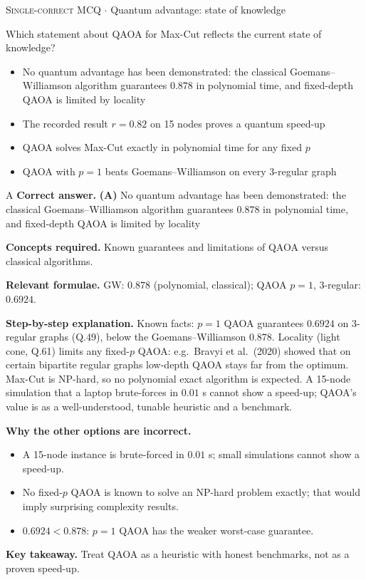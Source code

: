\documentclass[11pt,a4paper]{article}
\newcommand{\optlabel}[1]{\textbf{(#1)}}
\newcommand{\correctlabel}[1]{\textcolor{okgreen}{\textbf{(#1)}\,\ding{51}}}
\newenvironment{qitem}[1]{\begin{list}{}{\setlength{\leftmargin}{3.3em}\setlength{\labelwidth}{3.1em}%
  \setlength{\labelsep}{0.2em}\setlength{\topsep}{3pt}\setlength{\parsep}{3pt}}\item[\textbf{Q.#1}\hfill]}{\end{list}}
\newcommand{\qsep}{\par\vspace{2pt}{\color{black!15}\hrule}\vspace{4pt}}
\newcommand{\qmeta}[2]{{\footnotesize\color{black!60}\textsc{#1} \;$\cdot$\; #2}\par}
\begin{document}
\begin{qitem}{77}
\qmeta{Single-correct MCQ}{Quantum advantage: state of knowledge}
Which statement about QAOA for Max-Cut reflects the current state of knowledge?
\begin{itemize}[leftmargin=2.6em, labelsep=0.4em, itemsep=2pt, topsep=3pt]
\item[\correctlabel{A}] No quantum advantage has been demonstrated: the classical Goemans--Williamson algorithm guarantees $0.878$ in polynomial time, and fixed-depth QAOA is limited by locality
\item[\optlabel{B}] The recorded result $r = 0.82$ on 15 nodes proves a quantum speed-up
\item[\optlabel{C}] QAOA solves Max-Cut exactly in polynomial time for any fixed $p$
\item[\optlabel{D}] QAOA with $p = 1$ beats Goemans--Williamson on every 3-regular graph
\end{itemize}
\end{qitem}
\begin{solbox}{A}
\textbf{\color{brand}Correct answer.} \textcolor{okgreen}{\textbf{(A)}} No quantum advantage has been demonstrated: the classical Goemans--Williamson algorithm guarantees $0.878$ in polynomial time, and fixed-depth QAOA is limited by locality

\textbf{\color{brand}Concepts required.} Known guarantees and limitations of QAOA versus classical algorithms.

\textbf{\color{brand}Relevant formulae.} GW: $0.878$ (polynomial, classical); QAOA $p = 1$, 3-regular: $0.6924$.

\textbf{\color{brand}Step-by-step explanation.} Known facts: $p = 1$ QAOA guarantees $0.6924$ on 3-regular graphs (Q.49), below the Goemans--Williamson $0.878$. Locality
(light cone, Q.61) limits any fixed-$p$ QAOA: e.g.\ Bravyi et al.\ (2020) showed that on certain bipartite regular graphs low-depth
QAOA stays far from the optimum. Max-Cut is NP-hard, so no polynomial exact algorithm is expected. A 15-node simulation that a
laptop brute-forces in $0.01$ s cannot show a speed-up; QAOA's value is as a well-understood, tunable heuristic and a benchmark.

\textbf{\color{brand}Why the other options are incorrect.}
\begin{itemize}[leftmargin=2.4em, itemsep=1pt, topsep=2pt]
\item[\textbf{(B)}] A 15-node instance is brute-forced in $0.01$ s; small simulations cannot show a speed-up.
\item[\textbf{(C)}] No fixed-$p$ QAOA is known to solve an NP-hard problem exactly; that would imply surprising complexity results.
\item[\textbf{(D)}] $0.6924 < 0.878$: $p = 1$ QAOA has the weaker worst-case guarantee.
\end{itemize}
\textbf{\color{brand}Key takeaway.} Treat QAOA as a heuristic with honest benchmarks, not as a proven speed-up.
\end{solbox}
\qsep
\end{document}

